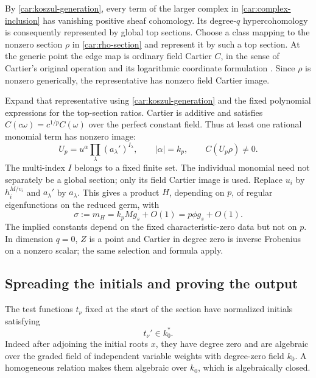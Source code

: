 By \eqref{car:koszul-generation}, every term of the larger
complex in \eqref{car:complex-inclusion} has vanishing positive
sheaf cohomology. Its degree-$q$ hypercohomology is consequently
represented by global top sections. Choose a class mapping to
the nonzero section $\rho$ in \eqref{car:rho-section} and represent
it by such a top section. At the generic point the edge map is
ordinary field Cartier $C$, in the sense of Cartier's original
operation and its logarithmic coordinate formulation
\cite{Cartier1957}\cite[Theorem~7.2 and its proof]{Katz1970}. Since $\rho$ is nonzero generically,
the representative has nonzero field Cartier image.

Expand that representative using \eqref{car:koszul-generation}
and the fixed polynomial expressions for the top-section ratios.
Cartier is additive and satisfies
$C(c\omega)=c^{1/p}C(\omega)$ over the perfect constant field.
Thus at least one rational monomial term has nonzero image:
\begin{equation}\label{car:Up}
 U_p=u^\alpha\prod_\lambda(a_\lambda')^{I_\lambda},
 \qquad |\alpha|=k_p,\qquad C(U_p\rho)\ne0.
\end{equation}
The multi-index $I$ belongs to a fixed finite set. The individual
monomial need not separately be a global section; only its field
Cartier image is used. Replace $u_i$ by $h_i^{M/v_i}$ and
$a_\lambda'$ by $a_\lambda$. This gives a product $H$, depending on $p$, of
regular eigenfunctions on the reduced germ, with
\begin{equation}\label{car:C1}
 \sigma:=m_H=k_pM g_s+O(1)=p\phi g_s+O(1).
\end{equation}
The implied constants depend on the fixed characteristic-zero
data but not on $p$. In dimension $q=0$, $Z$ is a point and
Cartier in degree zero is inverse Frobenius on a nonzero scalar;
the same selection and formula apply.

\subsection{Spreading the initials and proving the output}

The test functions $t_\nu$ fixed at the start of the section have
normalized initials satisfying
\begin{equation}\label{car:constant-tests}
 t_\nu'\in k_0^*.
\end{equation}
Indeed after adjoining the initial roots $x$, they have degree
zero and are algebraic over the graded field of independent
variable weights with degree-zero field $k_0$. A homogeneous
relation makes them algebraic over $k_0$, which is algebraically
closed.

